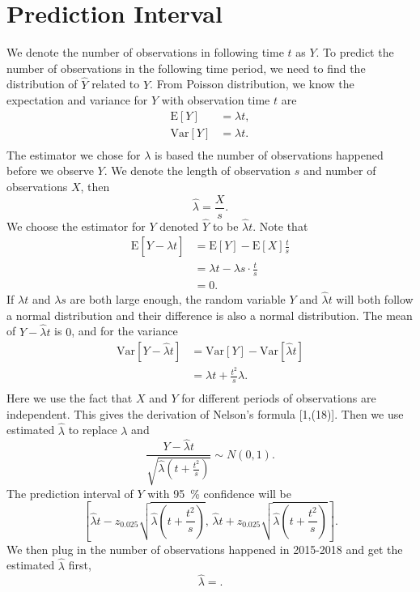 \documentclass[11pt,a4paper,english]{article}
\begin{document}
\section{Prediction Interval}
We denote the number of observations in following time $t$ as $Y$.
To predict the number of observations in the following time period, we need to find the distribution of $\hat{Y}$ related to $Y$. From Poisson distribution, we know the expectation and variance for $Y$ with observation time $t$ are
\begin{align*}
	\text{E}[Y] &= \lambda t,\\
	\text{Var}[Y] &= \lambda t.\\
\end{align*}
The estimator we chose for $\lambda$ is based the number of observations happened before we observe $Y$.
We denote the length of observation $s$ and number of observations $X$, then
\begin{equation*}
	\hat{\lambda} = \frac{X}{s}.
\end{equation*}
We choose the estimator for $Y$ denoted $\hat{Y}$ to be $\hat{\lambda}t$.
Note that
\begin{align*}
	\text{E}[Y-\hat{\lambda}t] &= \text{E}[Y]-\text{E}[X]\frac{t}{s}\\
	&= \lambda t-\lambda s \cdot \frac{t}{s}\\
	&= 0.
\end{align*}
If $\lambda t$ and $\lambda s$ are both large enough, the random variable $Y$ and $\hat{\lambda}t$ will both follow a normal distribution and their difference is also a normal distribution.
The mean of $Y-\hat{\lambda}t$ is $0$, and for the variance
\begin{align*}
	\text{Var}[Y-\hat{\lambda}t] &= \text{Var}[Y]-\text{Var}[\hat{\lambda}t]\\
	&= \lambda t+\frac{t^{2}}{s}\lambda.\\
\end{align*}
Here we use the fact that $X$ and $Y$ for different periods of observations are independent.
This gives the derivation of Nelson's formula [1,(18)].
Then we use estimated $\hat{\lambda}$ to replace $\lambda$ and 
\begin{equation*}
	\frac{Y-\hat{\lambda}t}{\sqrt{\hat{\lambda}\left(t+\frac{t^{2}}{s}\right)}} \sim N(0,1).
\end{equation*}
The prediction interval of $Y$ with \SI{95}{\percent} confidence will be 
\begin{equation*}
	\left[
	\hat{\lambda}t-z_{0.025}\sqrt{\hat{\lambda}\left(t+\frac{t^{2}}{s}\right)},
	\,
	\hat{\lambda}t+z_{0.025}\sqrt{\hat{\lambda}\left(t+\frac{t^{2}}{s}\right)}
	\right].
\end{equation*}
We then plug in the number of observations happened in 2015-2018 and get the estimated $\hat{\lambda}$ first,
\[\hat{\lambda} = .\]
\end{document}
